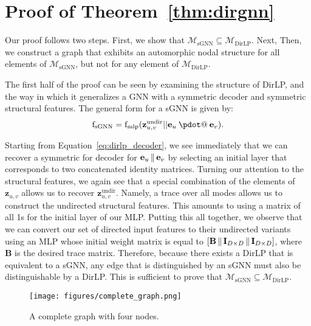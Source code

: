\documentclass{article}
\makeatletter
\DeclareMathOperator*{\concat}{\scalerel*{\Vert}{\sum}}
\DeclareRobustCommand{\pdot}{\mathbin{\mathpalette\pdot@\relax}}\newcommand{\pdot@}[2]{\ooalign{$\m@th#1\circ$\cr\hidewidth$\m@th#1\cdot$\hidewidth\cr}}
\makeatother
\begin{document}
\section{Proof of Theorem~\ref{thm:dirgnn}}\label{app:proof}
Our proof follows two steps. First, we show that $\mathcal{M}_{\operatorname{sGNN}} \subseteq \mathcal{M}_{\operatorname{DirLP}}$. Next, Then, we construct a graph that exhibits an automorphic nodal structure for all elements of $\mathcal{M}_{\operatorname{sGNN}}$, but not for any element of $\mathcal{M}_{\operatorname{DirLP}}$.

The first half of the proof can be seen by examining the structure of DirLP, and the way in which it generalizes a GNN with a symmetric decoder and symmetric structural features. The general form for a sGNN is given by:
\begin{equation}
    \operatorname{f_{\operatorname{sGNN}}} = \operatorname{f_{mlp}}( \mathbf{z}^{\operatorname{undir}}_{u, v} || \mathbf{e}_u \pdot \mathbf{e}_v).
\end{equation}

Starting from Equation~\ref{eq:dirlp_decoder}, we see immediately that we can recover a symmetric for decoder for $\mathbf{e}_u \concat \mathbf{e}_v$ by selecting an initial layer that corresponds to two concatenated identity matrices. Turning our attention to the structural features, we again see that a special combination of the elements of $\mathbf{z}_{u, v}$ allows us to recover $\textbf{z}^{\operatorname{undir}}_{u, v}$. Namely, a trace over all modes allows us to construct the undirected structural features. This amounts to using a matrix of all 1s for the initial layer of our MLP. Putting this all together, we observe that we can convert our set of directed input features to their undirected variants using an MLP whose initial weight matrix is equal to $ [ \mathbf{B} \concat \mathbf{I}_{D \times D} \concat \mathbf{I}_{D \times D} ] $, where $\mathbf{B}$ is the desired trace matrix. Therefore, because there exists a DirLP that is equivalent to a sGNN, any edge that is distinguished by an sGNN must also be distinguishable by a DirLP. This is sufficient to prove that $\mathcal{M}_{\operatorname{sGNN}} \subseteq \mathcal{M}_{\operatorname{DirLP}}$.

\begin{figure}
    \begin{center}
    \texttt{[image: figures/complete\_graph.png]}
    \end{center}
    \caption{A complete graph with four nodes.}
    \label{fig:complete_graph}
\end{figure}
\end{document}
